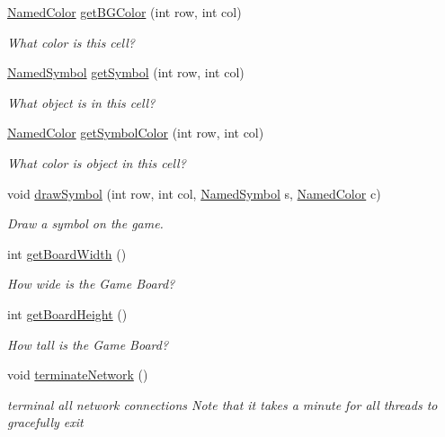 \begin{DoxyCompactItemize}
\mbox{\hyperlink{enumbridges_1_1base_1_1_named_color}{Named\+Color}} \mbox{\hyperlink{classbridges_1_1games_1_1_game_base_abe167e48f828be58d01ecb252afe6c7c}{get\+B\+G\+Color}} (int row, int col)
\begin{DoxyCompactList}\small\item\em What color is this cell? \end{DoxyCompactList}\item 
\mbox{\hyperlink{enumbridges_1_1base_1_1_named_symbol}{Named\+Symbol}} \mbox{\hyperlink{classbridges_1_1games_1_1_game_base_ade3cd7d7c3b317645a41ea93449c0f63}{get\+Symbol}} (int row, int col)
\begin{DoxyCompactList}\small\item\em What object is in this cell? \end{DoxyCompactList}\item 
\mbox{\hyperlink{enumbridges_1_1base_1_1_named_color}{Named\+Color}} \mbox{\hyperlink{classbridges_1_1games_1_1_game_base_a8a7782a6d1238ea3cbe26da9c04b2416}{get\+Symbol\+Color}} (int row, int col)
\begin{DoxyCompactList}\small\item\em What color is object in this cell? \end{DoxyCompactList}\item 
void \mbox{\hyperlink{classbridges_1_1games_1_1_game_base_a03e8446feb00d5957a7e160a4fa76342}{draw\+Symbol}} (int row, int col, \mbox{\hyperlink{enumbridges_1_1base_1_1_named_symbol}{Named\+Symbol}} s, \mbox{\hyperlink{enumbridges_1_1base_1_1_named_color}{Named\+Color}} c)
\begin{DoxyCompactList}\small\item\em Draw a symbol on the game. \end{DoxyCompactList}\item 
int \mbox{\hyperlink{classbridges_1_1games_1_1_game_base_a33018840a6f19eb54ef27e55231871f5}{get\+Board\+Width}} ()
\begin{DoxyCompactList}\small\item\em How wide is the Game Board? \end{DoxyCompactList}\item 
int \mbox{\hyperlink{classbridges_1_1games_1_1_game_base_a1effb2a789eb19eb81dec64f25be233e}{get\+Board\+Height}} ()
\begin{DoxyCompactList}\small\item\em How tall is the Game Board? \end{DoxyCompactList}\item 
void \mbox{\hyperlink{classbridges_1_1games_1_1_game_base_a3b0898cf9a8348245cd16382d670b486}{terminate\+Network}} ()
\begin{DoxyCompactList}\small\item\em terminal all network connections Note that it takes a minute for all threads to gracefully exit \end{DoxyCompactList}\end{DoxyCompactItemize}
